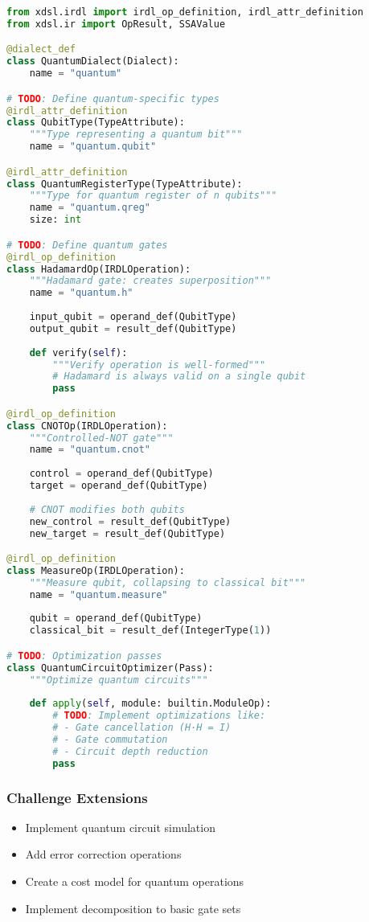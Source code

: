 \documentclass[11pt,a4paper]{article}
\begin{document}
\begin{lstlisting}[language=Python, caption=Exercise: Quantum Dialect]
from xdsl.irdl import irdl_op_definition, irdl_attr_definition
from xdsl.ir import OpResult, SSAValue

@dialect_def
class QuantumDialect(Dialect):
    name = "quantum"

# TODO: Define quantum-specific types
@irdl_attr_definition
class QubitType(TypeAttribute):
    """Type representing a quantum bit"""
    name = "quantum.qubit"

@irdl_attr_definition  
class QuantumRegisterType(TypeAttribute):
    """Type for quantum register of n qubits"""
    name = "quantum.qreg"
    size: int

# TODO: Define quantum gates
@irdl_op_definition
class HadamardOp(IRDLOperation):
    """Hadamard gate: creates superposition"""
    name = "quantum.h"
    
    input_qubit = operand_def(QubitType)
    output_qubit = result_def(QubitType)
    
    def verify(self):
        """Verify operation is well-formed"""
        # Hadamard is always valid on a single qubit
        pass

@irdl_op_definition
class CNOTOp(IRDLOperation):
    """Controlled-NOT gate"""
    name = "quantum.cnot"
    
    control = operand_def(QubitType)
    target = operand_def(QubitType)
    
    # CNOT modifies both qubits
    new_control = result_def(QubitType)
    new_target = result_def(QubitType)

@irdl_op_definition
class MeasureOp(IRDLOperation):
    """Measure qubit, collapsing to classical bit"""
    name = "quantum.measure"
    
    qubit = operand_def(QubitType)
    classical_bit = result_def(IntegerType(1))

# TODO: Optimization passes
class QuantumCircuitOptimizer(Pass):
    """Optimize quantum circuits"""
    
    def apply(self, module: builtin.ModuleOp):
        # TODO: Implement optimizations like:
        # - Gate cancellation (H·H = I)
        # - Gate commutation 
        # - Circuit depth reduction
        pass
\end{lstlisting}

\subsubsection{Challenge Extensions}
\begin{itemize}
    \item Implement quantum circuit simulation
    \item Add error correction operations
    \item Create a cost model for quantum operations
    \item Implement decomposition to basic gate sets
\end{itemize}
\end{document}
